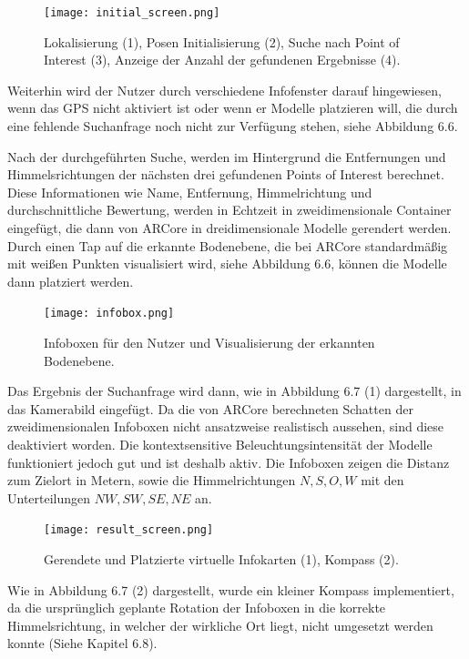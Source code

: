 \begin{figure}[H]
	\centering
	\texttt{[image: initial\_screen.png]}
	\caption{Lokalisierung (1), Posen Initialisierung (2),  Suche nach Point of Interest (3), Anzeige der Anzahl der gefundenen Ergebnisse (4).}
\end{figure} 

Weiterhin wird der Nutzer durch verschiedene Infofenster darauf hingewiesen, wenn das GPS nicht aktiviert ist oder wenn er Modelle platzieren will, die durch eine fehlende Suchanfrage noch nicht zur Verfügung stehen, siehe Abbildung 6.6. 

Nach der durchgeführten Suche, werden im Hintergrund die Entfernungen und Himmelsrichtungen der nächsten drei gefundenen Points of Interest berechnet. Diese Informationen wie Name, Entfernung, Himmelrichtung und durchschnittliche Bewertung, werden in Echtzeit in zweidimensionale Container eingefügt, die dann von ARCore in dreidimensionale Modelle gerendert werden. \\ Durch einen Tap auf die erkannte Bodenebene, die bei ARCore standardmäßig mit weißen Punkten visualisiert wird, siehe Abbildung 6.6, können die Modelle dann platziert werden.

\begin{figure}[H]
	\centering
	\texttt{[image: infobox.png]}
	\caption{Infoboxen für den Nutzer und Visualisierung der erkannten Bodenebene.}
\end{figure} 

Das Ergebnis der Suchanfrage wird dann, wie in Abbildung 6.7 (1) dargestellt, in das Kamerabild eingefügt. Da die von ARCore berechneten Schatten der zweidimensionalen Infoboxen nicht ansatzweise realistisch aussehen, sind diese deaktiviert worden. Die kontextsensitive Beleuchtungsintensität der Modelle funktioniert jedoch gut und ist deshalb aktiv. Die Infoboxen zeigen die Distanz zum Zielort in Metern, sowie die Himmelrichtungen $N, S, O, W$ mit den Unterteilungen $NW, SW, SE, NE$ an. 

\begin{figure}[H]
	\centering
	\hspace*{-0.5in}
	\texttt{[image: result\_screen.png]}
	\caption{Gerendete und Platzierte virtuelle Infokarten (1), Kompass (2).}
\end{figure} 

Wie in Abbildung 6.7 (2) dargestellt, wurde ein kleiner Kompass implementiert, da die ursprünglich geplante Rotation der Infoboxen in die korrekte Himmelsrichtung, in welcher der wirkliche Ort liegt, nicht umgesetzt werden konnte (Siehe Kapitel 6.8). 


